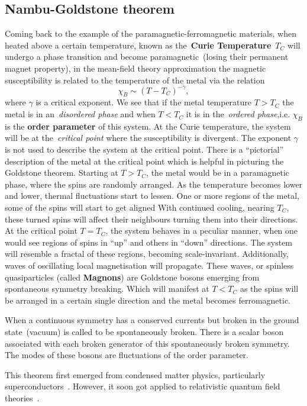 \subsection{Nambu-Goldstone theorem}
Coming back to the example of the paramagnetic-ferromagnetic materials, when heated above a certain temperature, known as the~\textbf{Curie Temperature}~$T_C$ will undergo a phase transition and become paramagnetic~(losing their permanent magnet property), in the mean-field theory approximation the magnetic susceptibility is related to the temperature of the metal via the relation
\begin{equation}
    \chi_B \sim (T-T_C)^{-\gamma},
\end{equation}  
where $\gamma$ is a critical exponent. We see that if the metal temperature $T>T_C$ the metal is in an~\textit{disordered phase} and when $T<T_C$ it is in the~\textit{ordered phase},i.e. $\chi_B$ is the \textbf{order parameter} of this system. At the Curie temperature, the system will be at the~\textit{critical point} where the susceptibility is divergent. The exponent $\gamma$ is not used to describe the system at the critical point. There is a ``pictorial'' description of the metal at the critical point which is helpful in picturing the Goldstone theorem. Starting at $T>T_C$, the metal would be in a paramagnetic phase, where the spins are randomly arranged. As the temperature becomes lower and lower, thermal fluctuations start to lessen.  One or more regions of the metal, some of the spins will start to get aligned With continued cooling, nearing $T_C$, these turned spins will affect their neighbours turning them into their directions. At the critical point $T=T_C$, the system behaves in a peculiar manner, when one would see regions of spins in ``up'' and others in ``down'' directions. The system will resemble a fractal of these regions, becoming scale-invariant. Additionally, waves of oscillating local magnetisation will propagate. These waves, or spinless quasiparticles (called \textbf{Magnons}) are Goldstone bosons emerging from spontaneous symmetry breaking. Which will manifest at $T<T_C$ as the spins will be  arranged in a certain single direction and the metal becomes ferromagnetic.
\begin{theorem}
    When a continuous symmetry has a conserved currents but broken in the ground state~(vacuum) is called to be spontaneously broken. There is a scalar boson associated with each broken generator of this spontaneously broken symmetry. The modes of these bosons are fluctuations of the order parameter.
\end{theorem}
This theorem first emerged from condensed matter physics, particularly superconductors~\cite{PhysRev.117.648,goldstone}. However, it soon got applied to relativistic quantum field theories~\cite{PhysRev.127.965}.
